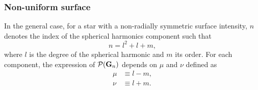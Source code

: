 \documentclass[modern]{aastex631}
\begin{document}
\subsubsection{Non-uniform surface}\label{non-uniform}
In the general case, for a star with a non-radially symmetric surface intensity, $n$ denotes the index of the spherical harmonics component such that
\begin{equation}
    \label{eq:n}
    n = l^2 + l + m,
\end{equation}
where $l$ is the degree of the spherical harmonic and $m$ its order. For each component, the expression of $\mathcal{P}({\mathbf{G}}_n)$ depends on $\mu$ and $\nu$ defined as
\begin{equation}
    \label{eq:munu}
    \begin{aligned}
    \mu &\equiv l - m,\\
    \nu &\equiv l + m.
    \end{aligned}
\end{equation}
\end{document}
